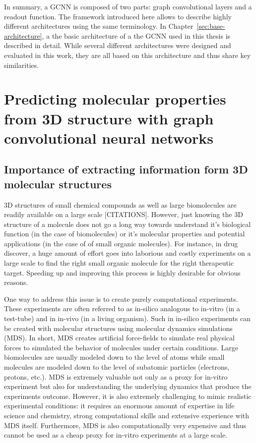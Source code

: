 In summary, a GCNN is composed of two parts: graph convolutional layers and a readout function. The framework introduced here allows to describe highly different architectures using the same terminology. In Chapter~\ref{sec:base-architecture}, a the basic architecture of a the GCNN used in this thesis is described in detail. While several different architectures were designed and evaluated in this work, they are all based on this architecture and thus share key similarities.


\section{Predicting molecular properties from 3D structure with graph convolutional neural networks}

\subsection{Importance of extracting information form 3D molecular structures}

3D structures of small chemical compounds as well as large biomolecules are readily available on a large scale [CITATIONS]. However, just knowing the 3D structure of a molecule does not go a long way towards understand it's biological function (in the case of biomolecules) or it's molecular properties and potential applications (in the case of of small organic molecules). For instance, in drug discover, a huge amount of effort goes into laborious and costly experiments on a large scale to find the right small organic molecule for the right therapeutic target. Speeding up and improving this process is highly desirable for obvious reasons.

One way to address this issue is to create purely computational experiments. These experiments are often referred to as in-silico analogous to in-vitro (in a test-tube) and in in-vivo (in a living organism). Such in in-silico experiments can be created with molecular structures using molecular dynamics simulations (MDS). In short, MDS creates artificial force-fields to simulate real physical forces to simulated the behavior of molecules under certain conditions. Large biomolecules are usually modeled down to the level of atoms while small molecules are modeled down to the level of subatomic particles (electrons, protons, etc.). MDS is extremely valuable not only as a proxy for in-vitro experiment but also for understanding the underlying dynamics that produce the experiments outcome. However, it is also extremely challenging to mimic realistic experimental conditions: it requires an enormous amount of expertise in life science and chemistry, strong computational skills and extensive experience with MDS itself. Furthermore, MDS is also computationally very expensive and thus cannot be used as a cheap proxy for in-vitro experiments at a large scale.


